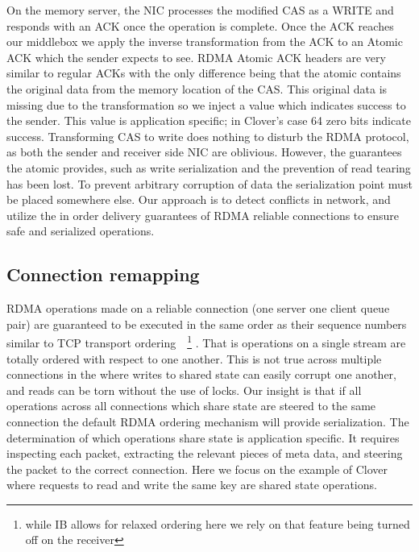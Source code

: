 On the memory server, the NIC processes the modified CAS as a WRITE and responds
with an ACK once the operation is complete. Once the ACK reaches our middlebox
we apply the inverse transformation from the ACK to an Atomic ACK which the
sender expects to see. RDMA Atomic ACK headers are very similar to regular ACKs
with the only difference being that the atomic contains the original data from
the memory location of the CAS. This original data is missing due to the
transformation so we inject a value which indicates success to the sender.
This value is application specific; in Clover's case 64 zero bits indicate
success. Transforming CAS to write does nothing to disturb the RDMA protocol,
as both the sender and receiver side NIC are oblivious.  
However, the guarantees the atomic provides, such as write serialization and the
prevention of read tearing has been lost. To prevent arbitrary corruption of
data the serialization point must be placed somewhere else. Our approach is to
detect conflicts in network, and utilize the in order delivery guarantees of
RDMA reliable connections to ensure safe and serialized operations.

\subsection{Connection remapping}

RDMA operations made on a reliable connection (one server one client queue pair)
are guaranteed to be executed in the same order as their sequence numbers
similar to TCP transport ordering~\cite{infiniband-spec}~\footnote{while IB
allows for relaxed ordering here we rely on that feature being turned off on the
receiver} . That is operations on a single stream are totally ordered with
respect to one another. This is not true across multiple connections in the
where writes to shared state can easily corrupt one another, and reads can be
torn without the use of locks.  Our insight is that if all operations across all
connections which share state are steered to the same connection the default
RDMA ordering mechanism will provide serialization.  The determination of which
operations share state is application specific. It requires inspecting each
packet, extracting the relevant pieces of meta data, and steering the packet to
the correct connection. Here we focus on the example of Clover where requests to
read and write the same key are shared state operations.


